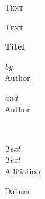 \begin{titlepage}
\begin{center}
{\scshape\LARGE Text\par}
\vspace{1cm}
\textsc{\Large Text}\\[0.5cm] %
\vspace{.5cm}

{\huge \bfseries Titel\par}
\vspace{0.4cm} %

\begin{minipage}[t]{0.4\textwidth}
\begin{flushleft} \large
\centering
\textit{by}\\
Author
\end{flushleft}
\end{minipage}
\begin{minipage}[t]{0.4\textwidth}
\begin{flushright} \large
\centering
\textit{and}\\
Author
\end{flushright}
\end{minipage}\\[3cm]

\vfill

\large \textit{Text}\\[0.3cm]
\textit{Text}\\[0.4cm]
Affiliation\\[2cm]

\vfill

{\large Datum}
\end{center}

\end{titlepage}